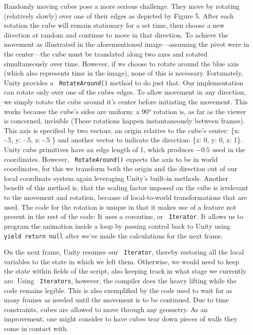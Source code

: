 \documentclass{report}
\newcommand{\cs}[1]{\texttt{\penalty 100 #1}}
\begin{document}
Randomly moving cubes pose a more serious challenge.
They move by rotating (relatively slowly) over one of their edges as depicted by Figure 5.
 After each rotation the cube will remain stationary for a set time, then choose a new direction at random and continue to move in that direction.
To achieve the movement as illustrated in the aforementioned image---assuming the pivot were in the center---the cube must be translated along two axes and rotated simultaneously over time. 
  However, if we choose to rotate around the blue axis (which also represents time in the image), none of this is necessary.
 Fortunately, Unity provides a \cs{RotateAround()} method to do just that.
Our implementation can rotate only over one of the cubes edges.
To allow movement in any direction, we simply rotate the cube around it's center before initiating the movement.
This works because the cube's sides are uniform: a 90° rotation is, as far as the viewer is concerned, invisible (These rotations happen instantaneously between frames).
This axis is specified by two vectors, an origin relative to the cube's center: \{x: -.5, y: -.5, z: -.5 \} and another vector to indicate the direction: \{x: 0, y: 0, z: 1\}.
Unity cube primitives have an edge length of 1, which produces $-0.5$ used in the coordinates. 
However, \cs{RotateAround()} expects the axis to be in world coordinates, for this we transform both the origin and the direction out of our local coordinate system again leveraging Unity's built-in methods. Another benefit of this method is, that the scaling factor imposed on the cube is irrelevant to the movement and rotation, because of local-to-world transformations that are used.
The code for the rotation is unique in that it makes use of a feature not present in the rest of the code: It uses a coroutine, or \cs{Iterator}\cite{yield}.
 It allows us to program the animation inside a loop by passing control back to Unity using \cs{yield return null} after we've made the calculations for the next frame.

  On the next frame, Unity resumes our \cs{Iterator}, thereby restoring all the local variables to the state in which we left them. Otherwise, we would need to keep the state within fields of the script, also keeping track in what stage we currently are. 
 Using \cs{Iterators}, however, the compiler does the heavy lifting while the code remains legible. This is also exemplified by the code used to wait for as many frames as needed until the movement is to be continued.
Due to time constraints, cubes are allowed to move through any geometry. As an improvement, one might consider to have cubes tear down pieces of walls they come in contact with.
\end{document}

